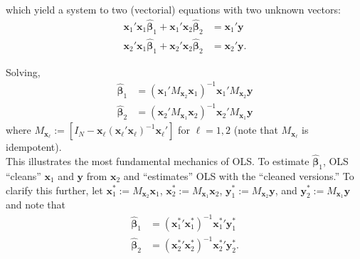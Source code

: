 \noindent which yield a system to two (vectorial) equations with two unknown vectors: 
\begin{align}
	\bm{x}_1' \bm{x}_1 \bm{\hat{\beta}}_1 + \bm{x}_1' \bm{x}_2 \bm{\hat{\beta}}_2 & =  \bm{x}_1' \bm{y} \nonumber \\
		\bm{x}_2' \bm{x}_1 \bm{\hat{\beta}}_1 + \bm{x}_2' \bm{x}_2 \bm{\hat{\beta}}_2 & =  \bm{x}_2' \bm{y}. 
\end{align}

\noindent Solving, 
\begin{align}
		\hat{\bm{\beta}}_1 & = {\left( \bm{x}_1' M_{\bm{x}_2} \bm{x}_1 \right)}^{-1} \bm{x}_1' M_{\bm{x}_2} \bm{y} \nonumber \\
		\hat{\bm{\beta}}_2 & = {\left( \bm{x}_2' M_{\bm{x}_1} \bm{x}_2 \right)}^{-1} \bm{x}_2' M_{\bm{x}_1} \bm{y}
\end{align}
\noindent where $M_{\bm{x}_\ell}:= \left[ I_{N} - \bm{x}_\ell {\left( \bm{x}_\ell' \bm{x}_\ell \right)}^{-1} \bm{x}_\ell' \right]$ for $\ell = 1,2$ (note that $M_{\bm{x}_\ell}$ is idempotent).\\ 

\noindent This illustrates the most fundamental mechanics of OLS. To estimate $\hat{\bm{\beta}}_1$, OLS ``cleans'' $\bm{x}_1$ and $\bm{y}$ from $\bm{x}_2$ and ``estimates'' OLS with the ``cleaned versions.'' To clarify this further, let $\bm{x}_1^*:= M_{\bm{x}_2} \bm{x}_1$, $\bm{x}_2^*:= M_{\bm{x}_1} \bm{x}_2$, $\bm{y}_1^*:= M_{\bm{x}_2} \bm{y}$, and $\bm{y}_2^*:= M_{\bm{x}_1} \bm{y}$ and note that
\begin{align}
		\hat{\bm{\beta}}_1 & = {\left( {\bm{x}_1^*}' \bm{x}_1^* \right)}^{-1}{\bm{x}_1^*}'\bm{y}_1^* \nonumber \\
		\hat{\bm{\beta}}_2 & = {\left( {\bm{x}_2^*}' \bm{x}_2^* \right)}^{-1}{\bm{x}_2^*}'\bm{y}_2^*. 
\end{align}


